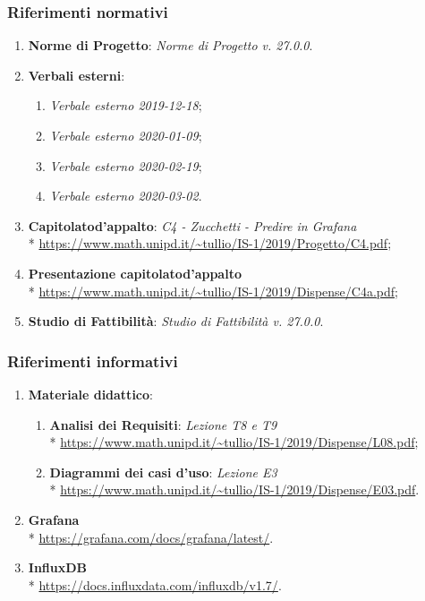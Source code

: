 		\subsubsection{Riferimenti normativi}
			\begin{enumerate}
				\item \textbf{Norme di Progetto}: \textit{Norme di Progetto v. 27.0.0}.
				\item \textbf{Verbali esterni}:
				\begin{enumerate}
					\item \textit{Verbale esterno 2019-12-18};
					\item \textit{Verbale esterno 2020-01-09};
					\item \textit{Verbale esterno 2020-02-19};
					\item \textit{Verbale esterno 2020-03-02}.
				\end{enumerate}
				\item \textbf{Capitolato}\glosp \textbf{d'appalto}: \textit{C4 - Zucchetti - Predire in Grafana}\glo \\*
				\url{https://www.math.unipd.it/~tullio/IS-1/2019/Progetto/C4.pdf};
				\item \textbf{Presentazione capitolato}\glosp \textbf{d'appalto} \\*
				\url{https://www.math.unipd.it/~tullio/IS-1/2019/Dispense/C4a.pdf};
				\item \textbf{Studio di Fattibilità}: \textit{Studio di Fattibilità v. 27.0.0}.
			\end{enumerate}
		\subsubsection{Riferimenti informativi}
			\begin{enumerate}
				\item \textbf{Materiale didattico}:
				\begin{enumerate}
					\item \textbf{Analisi dei Requisiti}: \textit{Lezione T8 e T9} \\*
					\url{https://www.math.unipd.it/~tullio/IS-1/2019/Dispense/L08.pdf};
					\item \textbf{Diagrammi dei casi d'uso}\glo: \textit{Lezione E3} \\*
					\url{https://www.math.unipd.it/~tullio/IS-1/2019/Dispense/E03.pdf}.
				\end{enumerate}
				\item \textbf{Grafana}\glo \\*
					\url{https://grafana.com/docs/grafana/latest/}.
				\item \textbf{InfluxDB} \\*
					\url{https://docs.influxdata.com/influxdb/v1.7/}.
			\end{enumerate}
